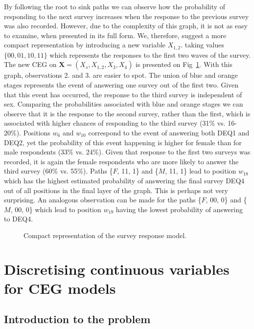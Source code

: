 \documentclass[runningheads]{llncs}
\begin{document}
By following the root to sink paths we can observe how the probability of responding to the next survey increases when the response to the previous survey was also recorded. However, due to the complexity of this graph, it is not as easy to examine, when presented in its full form. We, therefore, suggest a more compact representation by introducing a new variable $X_{1,2}$. taking values $\{00, 01, 10, 11\}$ which represents the responses to the first two waves of the survey. The new CEG on $\boldsymbol{X} = (X_s, X_{1,2}, X_3, X_4)$ is presented on Fig~\ref{ceg:compact-responses}. With this graph, observations 2. and 3. are easier to spot. The union of blue and orange stages represents the event of answering one survey out of the first two. Given that this event has occurred, the response to the third survey is independent of sex. Comparing the probabilities associated with blue and orange stages we can observe that it is the response to the second survey, rather than the first, which is associated with higher chances of responding to the third survey (31\% vs. 16-20\%). Positions $w_6$ and $w_{10}$ correspond to the event of answering both DEQ1 and DEQ2, yet the probability of this event happening is higher for female than for male respondents (33\% vs. 24\%). Given that response to the first two surveys was recorded, it is again the female respondents who are more likely to answer the third survey (60\% vs. 55\%). Paths \{$F$, 11, 1\} and \{$M$, 11, 1\} lead to position $w_{18}$ which has the highest estimated probability of answering the final survey DEQ4 out of all positions in the final layer of the graph. This is perhaps not very surprising. An analogous observation can be made for the paths \{$F$, 00, 0\} and \{$M$, 00, 0\} which lead to position $w_{19}$ having the lowest probability of answering to DEQ4.
\begin{figure}
\centering

\vspace{1ex}
\caption{Compact representation of the survey response model.}
\label{ceg:compact-responses}
\end{figure}


%
%
\section{Discretising continuous variables for CEG models}\label{sec:discretise}

\subsection{Introduction to the problem}
\end{document}
